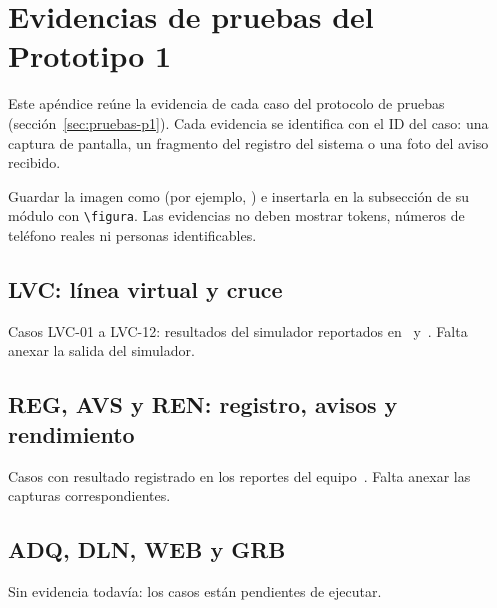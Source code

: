 \chapter{Evidencias de pruebas del Prototipo 1}
\label{cap:evidencias-p1}

Este apéndice reúne la evidencia de cada caso del protocolo de pruebas
(sección~\ref{sec:pruebas-p1}). Cada evidencia se identifica con el ID del
caso: una captura de pantalla, un fragmento del registro del sistema o una
foto del aviso recibido.

\begin{nota}[title={Cómo agregar una evidencia}]
Guardar la imagen como  (por
ejemplo, ) e insertarla en la subsección de su módulo con
\texttt{\textbackslash figura}. Las evidencias no deben mostrar tokens,
números de teléfono reales ni personas identificables.
\end{nota}

\section{LVC: línea virtual y cruce}

Casos LVC-01 a LVC-12: resultados del simulador reportados
en~\cite{rep-fusion} y~\cite{rep-tecnico}. Falta anexar la salida del
simulador.

\section{REG, AVS y REN: registro, avisos y rendimiento}

Casos con resultado registrado en los reportes del
equipo~\cite{rep-fusion,rep-envivo,rep-whatsapp,rep-tecnico}. Falta anexar
las capturas correspondientes.

\section{ADQ, DLN, WEB y GRB}

Sin evidencia todavía: los casos están pendientes de ejecutar.
